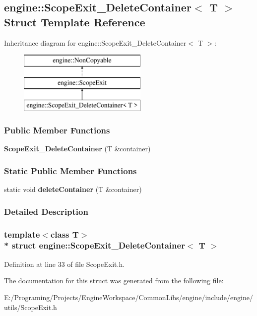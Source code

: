 \hypertarget{a00064}{}\subsection{engine\+:\+:Scope\+Exit\+\_\+\+Delete\+Container$<$ T $>$ Struct Template Reference}
\label{a00064}
Inheritance diagram for engine\+:\+:Scope\+Exit\+\_\+\+Delete\+Container$<$ T $>$\+:\begin{figure}[H]
\begin{center}
\leavevmode
\includegraphics[height=3.000000cm]{a00064}
\end{center}
\end{figure}
\subsubsection*{Public Member Functions}
\begin{DoxyCompactItemize}
\item 
{\bfseries Scope\+Exit\+\_\+\+Delete\+Container} (T \&container)\hypertarget{a00064_a2f092ad5ade85806194ba49e4431ac10}{}\label{a00064_a2f092ad5ade85806194ba49e4431ac10}

\end{DoxyCompactItemize}
\subsubsection*{Static Public Member Functions}
\begin{DoxyCompactItemize}
\item 
static void {\bfseries delete\+Container} (T \&container)\hypertarget{a00064_aee150e0726f1f78446279420a52e13c0}{}\label{a00064_aee150e0726f1f78446279420a52e13c0}

\end{DoxyCompactItemize}


\subsubsection{Detailed Description}
\subsubsection*{template$<$class T$>$\\*
struct engine\+::\+Scope\+Exit\+\_\+\+Delete\+Container$<$ T $>$}



Definition at line 33 of file Scope\+Exit.\+h.



The documentation for this struct was generated from the following file\+:\begin{DoxyCompactItemize}
\item 
E\+:/\+Programing/\+Projects/\+Engine\+Workspace/\+Common\+Libs/engine/include/engine/utils/Scope\+Exit.\+h\end{DoxyCompactItemize}
